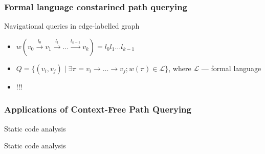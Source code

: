 \documentclass[xcolor=table,aspectratio=169]{beamer}
\begin{document}
\begin{frame}[fragile]
 
  \frametitle{Formal language constarined path querying}

  \begin{minipage}[t]{0.58\textwidth}
    Navigational queries in edge-labelled graph
    \begin{itemize}
    \item $w(v_0 \xrightarrow{l_0} v_1 \xrightarrow{l_1} \ldots \xrightarrow{l_{k-1}} v_k) = l_0 l_1 \ldots l_{k-1}$
    \item $Q = \{(v_i,v_j) \mid \exists \pi = v_i \to \ldots \to v_j; w(\pi) \in \mathcal{L}\}$, where $\mathcal{L}$ --- formal language
    \end{itemize}    
  \end{minipage}
  \begin{minipage}[t]{0.38\textwidth}
    \begin{itemize}
    \item !!!
    \end{itemize}    
  \end{minipage}

\end{frame}


\begin{frame}[fragile]
  \frametitle{Applications of Context-Free Path Querying}
  \begin{minipage}[t]{0.48\textwidth}
    Static code analysis
  \end{minipage}
  \begin{minipage}[t]{0.48\textwidth}
    Static code analysis
  \end{minipage}
\end{frame}
\end{document}
